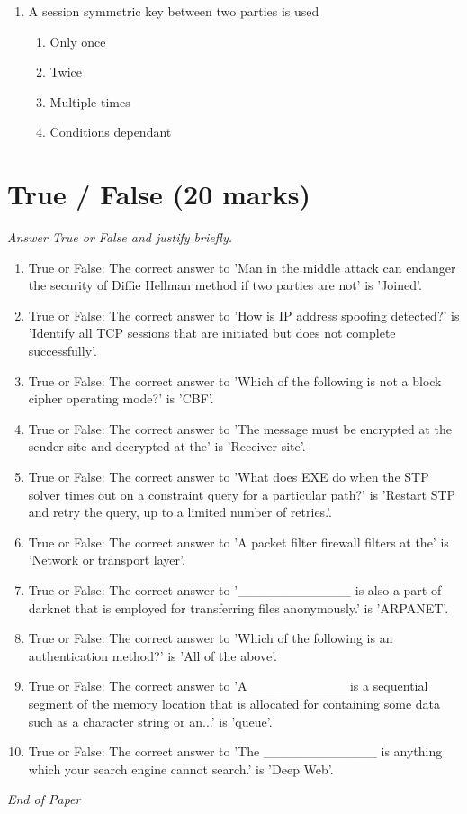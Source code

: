 \documentclass[12pt]{article}
\begin{document}
\begin{enumerate}[label=\arabic*.]
\begin{enumerate}[label=(\alph*)]
    \item Whois
    \item Nslookup
    \item IP Network Browser
\end{enumerate}
\item A session symmetric key between two parties is used
\begin{enumerate}[label=(\alph*)]
    \item Only once
    \item Twice
    \item Multiple times
    \item Conditions dependant
\end{enumerate}
\end{enumerate}

\section*{True / False (20 marks)}
\textit{Answer True or False and justify briefly.}
\begin{enumerate}[label=\arabic*.]
\item True or False: The correct answer to 'Man in the middle attack can endanger the security of Diffie Hellman method if two parties are not' is 'Joined'.
\item True or False: The correct answer to 'How is IP address spoofing detected?' is 'Identify all TCP sessions that are initiated but does not complete successfully'.
\item True or False: The correct answer to 'Which of the following is not a block cipher operating mode?' is 'CBF'.
\item True or False: The correct answer to 'The message must be encrypted at the sender site and decrypted at the' is 'Receiver site'.
\item True or False: The correct answer to 'What does EXE do when the STP solver times out on a constraint query for a particular path?' is 'Restart STP and retry the query, up to a limited number of retries.'.
\item True or False: The correct answer to 'A packet filter firewall filters at the' is 'Network or transport layer'.
\item True or False: The correct answer to '\_\_\_\_\_\_\_\_\_\_\_\_ is also a part of darknet that is employed for transferring files anonymously.' is 'ARPANET'.
\item True or False: The correct answer to 'Which of the following is an authentication method?' is 'All of the above'.
\item True or False: The correct answer to 'A \_\_\_\_\_\_\_\_\_\_ is a sequential segment of the memory location that is allocated for containing some data such as a character string or an...' is 'queue'.
\item True or False: The correct answer to 'The \_\_\_\_\_\_\_\_\_\_\_\_ is anything which your search engine cannot search.' is 'Deep Web'.
\end{enumerate}

\vfill
\noindent\textit{End of Paper}
\end{document}

